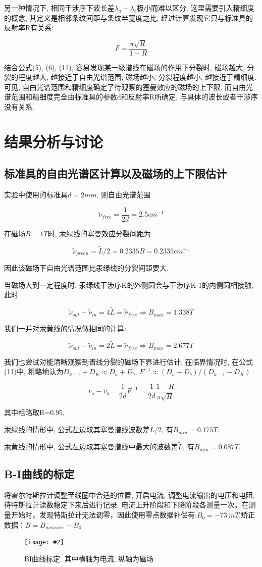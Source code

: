 \documentclass[12pt,a4paper]{article}
\newcommand{\be}[1]{
    \begin{equation}
        #1
    \end{equation}
}
\newcommand{\bfig}[3]{
    \begin{figure}[H]
        \centering
        \texttt{[image: \#2]}
        \caption{#3}
    \end{figure}
}
\begin{document}
另一种情况下, 相同干涉序下波长差$\lambda_{a}-\lambda_{b}$极小而难以区分. 这里需要引入精细度的概念, 其定义是相邻条纹间距与条纹半宽度之比, 
经过计算发现它只与标准具的反射率R有关系: 
\be{F=\frac{\pi \sqrt{R}}{1-R}}

结合公式(5), (6), (11), 容易发现某一级谱线在磁场的作用下分裂时, 磁场越大, 分裂的程度越大, 越接近于自由光谱范围; 磁场越小, 分裂程度越小, 越接近于精细度. 
可见, 自由光谱范围和精细度确定了待观察的塞曼效应的磁场的上下限. 而自由光谱范围和精细度完全由标准具的参数d和反射率R所确定, 与具体的波长或者干涉序没有关系. 
\section{结果分析与讨论}
\subsection{标准具的自由光谱区计算以及磁场的上下限估计}
实验中使用的标准具$d=2mm$, 则自由光谱范围
\be{\widetilde{\nu}_{free}=\frac{1}{2d}=2.5 cm^{-1}}
在磁场$B=1T$时, 汞绿线的塞曼效应分裂间距为
\be{\widetilde{\nu}_{green}=\widetilde{L}/2=0.2335B=0.2335 cm^{-1}}
因此该磁场下自由光谱范围比汞绿线的分裂间距要大. 

当磁场大到一定程度时, 汞绿线干涉序K的外侧圆会与干涉序K-1的内侧圆相接触, 此时
\be{\widetilde{\nu}_{out}-\widetilde{\nu}_{in}=4\widetilde{L}=\widetilde{\nu}_{free} \Rightarrow B_{max}=1.338T}
我们一并对汞黄线的情况做相同的计算:
\be{\widetilde{\nu}_{out}-\widetilde{\nu}_{in}=2\widetilde{L}=\widetilde{\nu}_{free} \Rightarrow B_{max}=2.677T}

我们也尝试对能清晰观察到谱线分裂的磁场下界进行估计, 在临界情况时, 在公式(11)中, 粗略地认为$D_{k-1}+D_{K}\approx D_{a}+D_{b}$, $F^{-1}\approx(D_{a}-D_b)/(D_{k-1}-D_{K})$
\be{\widetilde{v}_{a}-\widetilde{v}_{b}=\frac{1}{2d}F^{-1}=\frac{1}{2d}\frac{1-R}{\pi \sqrt{R}}}
其中粗略取R=0.95. 

汞绿线的情形中, 公式左边取其塞曼谱线波数差$\widetilde{L}/2$, 有$B_{min}=0.175T$. 

汞黄线的情形中, 公式左边取其塞曼谱线中最大的波数差$\widetilde{L}$, 有$B_{min}=0.087T$. 

\subsection{B-I曲线的标定}
将霍尔特斯拉计调整至线圈中合适的位置, 开启电流, 调整电流输出的电压和电阻, 待特斯拉计读数稳定下来后进行记录. 电流上升阶段和下降阶段各测量一次。在测量开始时，发现特斯拉计无法调零，因此使用零点数据补偿有:$B_0=\SI{-73}{mT}$,矫正数据：$B = B_{measure} - B_0$
\bfig{0.9}{BI曲线.png}{BI曲线标定. 其中横轴为电流, 纵轴为磁场}
\end{document}
